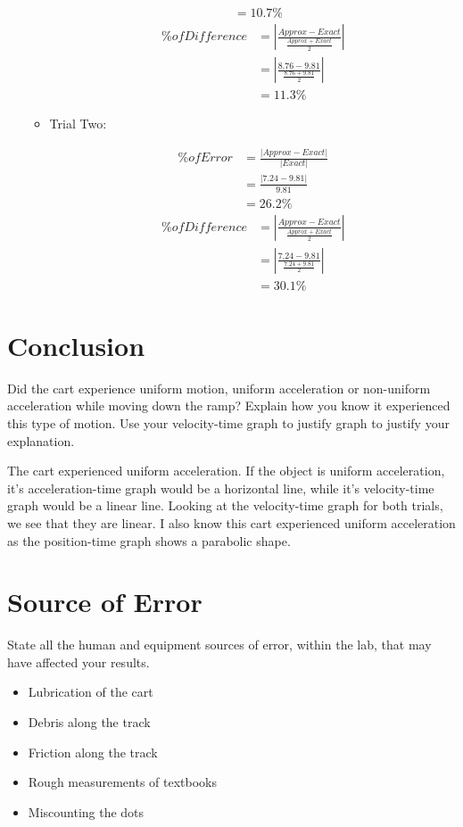 \documentclass[12pt]{article}
\begin{document}
\begin{enumerate}
\begin{itemize}
\begin{multicols}{2}
\begin{align*}
                &=10.7\%
            \end{align*}\break
            \begin{align*}
                \% of Difference &= |\frac{Approx - Exact}{\frac{Approx+Exact}{2}}|\\
                &=|\frac{8.76-9.81}{\frac{8.76+9.81}{2}}|\\
                &=11.3\%
            \end{align*}
        \end{multicols}
        \item Trial Two:
        \begin{multicols}{2}
            \begin{align*}
                \% of Error &= \frac{|Approx - Exact|}{|Exact|}\\
                &=\frac{|7.24-9.81|}{9.81}\\
                &=26.2\%
            \end{align*}\break
            \begin{align*}
                \% of Difference &= |\frac{Approx - Exact}{\frac{Approx+Exact}{2}}|\\
                &=|\frac{7.24-9.81}{\frac{7.24+9.81}{2}}|\\
                &=30.1\%
            \end{align*}
        \end{multicols}
    \end{itemize}
\end{enumerate}
\section{Conclusion}
Did the cart experience uniform motion, uniform acceleration or non-uniform acceleration while moving down the ramp? Explain how you know it experienced this type of motion. Use your velocity-time graph to justify graph to justify your explanation.

The cart experienced uniform acceleration. If the object is uniform acceleration, it's acceleration-time graph would be a horizontal line, while it's velocity-time graph would be a linear line. Looking at the velocity-time graph for both trials, we see that they are linear. I also know this cart experienced uniform acceleration as the position-time graph shows a parabolic shape.
\newpage
\section{Source of Error}
State all the human and equipment sources of error, within the lab, that may have affected your results.

\begin{itemize}
    \item Lubrication of the cart
    \item Debris along the track
    \item Friction along the track
    \item Rough measurements of textbooks
    \item Miscounting the dots
\end{itemize}
\end{document}
